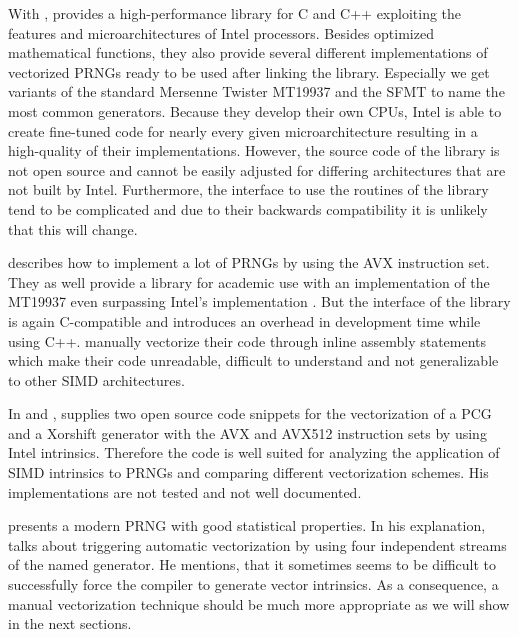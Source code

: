\documentclass{stdlocal}
\begin{document}
  With , \citeauthor{intel-mkl} provides a high-performance library for C and C++ exploiting the features and microarchitectures of Intel processors.
  Besides optimized mathematical functions, they also provide several different implementations of vectorized PRNGs ready to be used after linking the library.
  Especially we get variants of the standard Mersenne Twister MT19937 and the SFMT to name the most common generators.
  Because they develop their own CPUs, Intel is able to create fine-tuned code for nearly every given microarchitecture resulting in a high-quality of their implementations.
  However, the source code of the library is not open source and cannot be easily adjusted for differing architectures that are not built by Intel.
  Furthermore, the interface to use the routines of the library tend to be complicated and due to their backwards compatibility it is unlikely that this will change.

  \textcite{barash2017} describes how to implement a lot of PRNGs by using the AVX instruction set.
  They as well provide a library for academic use with an implementation of the MT19937 even surpassing Intel's implementation \autocite{rngavxlib,guskova2016}.
  But the interface of the library is again C-compatible and introduces an overhead in development time while using C++.
  \citeauthor{barash2017} manually vectorize their code through inline assembly statements which make their code unreadable, difficult to understand and not generalizable to other SIMD architectures.

  In \textcite{lemire-pcg} and \textcite{lemire-xorshift}, \citeauthor{lemire-pcg} supplies two open source code snippets for the vectorization of a PCG and a Xorshift generator with the AVX and AVX512 instruction sets by using Intel intrinsics.
  Therefore the code is well suited for analyzing the application of SIMD intrinsics to PRNGs and comparing different vectorization schemes.
  His implementations are not tested and not well documented.

  \textcite{vigna-xoroshiro} presents a modern PRNG with good statistical properties.
  In his explanation, \citeauthor{vigna-xoroshiro} talks about triggering automatic vectorization by using four independent streams of the named generator.
  He mentions, that it sometimes seems to be difficult to successfully force the compiler to generate vector intrinsics.
  As a consequence, a manual vectorization technique should be much more appropriate as we will show in the next sections.
\end{document}
